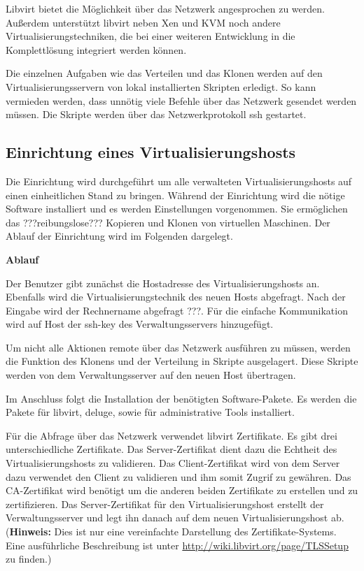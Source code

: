 Libvirt bietet die Möglichkeit über das Netzwerk angesprochen zu werden. Außerdem unterstützt libvirt neben Xen und KVM noch andere Virtualisierungstechniken, die bei einer weiteren Entwicklung in die Komplettlösung integriert werden können.%

Die einzelnen Aufgaben wie das Verteilen und das Klonen werden auf den Virtualisierungsservern von lokal installierten Skripten erledigt. So kann vermieden werden, dass unnötig viele Befehle über das Netzwerk gesendet werden müssen. Die Skripte werden über das Netzwerkprotokoll ssh gestartet.


\subsection{Einrichtung eines Virtualisierungshosts}\label{einrichtung}
Die Einrichtung wird durchgeführt um alle verwalteten Virtualisierungshosts auf einen einheitlichen Stand zu bringen. Während der Einrichtung wird die nötige Software installiert und es werden Einstellungen vorgenommen. Sie ermöglichen das ???reibungslose??? Kopieren und Klonen von virtuellen Maschinen. Der Ablauf der Einrichtung wird im Folgenden dargelegt. 

\textbf{Ablauf}

Der Benutzer gibt zunächst die Hostadresse des Virtualisierungshosts an. Ebenfalls wird die Virtualisierungstechnik des neuen Hosts abgefragt. Nach der Eingabe wird der Rechnername abgefragt ???. Für die einfache Kommunikation wird auf Host der ssh-key des Verwaltungsservers hinzugefügt. 

Um nicht alle Aktionen remote über das Netzwerk ausführen zu müssen, werden die Funktion des Klonens und der Verteilung in Skripte ausgelagert. Diese Skripte werden von dem Verwaltungsserver auf den neuen Host übertragen.

Im Anschluss folgt die Installation der benötigten Software-Pakete. Es werden die Pakete für libvirt, deluge, sowie für administrative Tools installiert. 

Für die Abfrage über das Netzwerk verwendet libvirt Zertifikate. Es gibt drei unterschiedliche Zertifikate. Das Server-Zertifikat dient dazu die Echtheit des Virtualisierungshosts zu validieren. Das Client-Zertifikat wird von dem Server dazu verwendet den Client zu validieren und ihm somit Zugrif zu gewähren. Das CA-Zertifikat wird benötigt um die anderen beiden Zertifikate zu erstellen und zu zertifizieren. Das Server-Zertifikat für den Virtualisierungshost erstellt der Verwaltungsserver und legt ihn danach auf dem neuen Virtualisierungshost ab. (\textbf{Hinweis:} Dies ist nur eine vereinfachte Darstellung des Zertifikate-Systems. Eine ausführliche Beschreibung ist unter \href{http://wiki.libvirt.org/page/TLSSetup}{http://wiki.libvirt.org/page/TLSSetup} zu finden.) 

